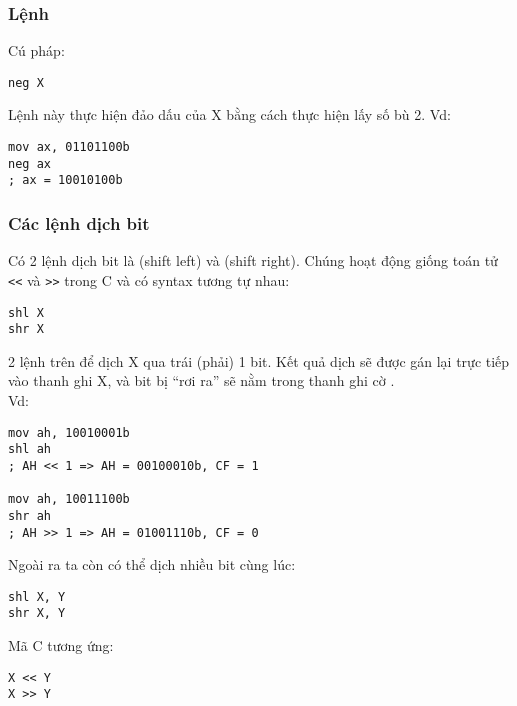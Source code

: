 \documentclass[main.tex]{subfiles}
\begin{document}
\subsubsection{Lệnh }
Cú pháp:
\begin{verbatim}
neg X
\end{verbatim}
Lệnh này thực hiện đảo dấu của X bằng cách thực hiện lấy số bù 2.
Vd:
\begin{verbatim}
mov ax, 01101100b
neg ax 
; ax = 10010100b
\end{verbatim}

\subsubsection{Các lệnh dịch bit}
Có 2 lệnh dịch bit là  (shift left) và  (shift right). Chúng hoạt động giống toán tử \verb#<<# và \verb#>># trong C và có syntax tương tự nhau:
\begin{verbatim}
shl X
shr X
\end{verbatim}
2 lệnh trên để dịch \cd X qua trái (phải) 1 bit. Kết quả dịch sẽ được gán lại trực tiếp vào thanh ghi \cd X, và bit bị ``rơi ra'' sẽ nằm trong thanh ghi cờ .\\
Vd:
\begin{verbatim}
mov ah, 10010001b
shl ah 
; AH << 1 => AH = 00100010b, CF = 1

mov ah, 10011100b
shr ah 
; AH >> 1 => AH = 01001110b, CF = 0
\end{verbatim}
Ngoài ra ta còn có thể dịch nhiều bit cùng lúc:
\begin{verbatim}
shl X, Y 
shr X, Y
\end{verbatim}
Mã C tương ứng:
\begin{verbatim}
X << Y 
X >> Y
\end{verbatim}
\end{document}
